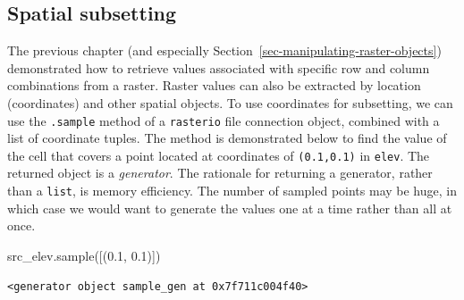 \documentclass[
  letterpaper,
]{krantz}
\newenvironment{Shaded}{\begin{snugshade}}{\end{snugshade}}
\newcommand{\FloatTok}[1]{\textcolor[rgb]{0.68,0.00,0.00}{#1}}
\newcommand{\NormalTok}[1]{\textcolor[rgb]{0.00,0.23,0.31}{#1}}
\begin{document}
\subsection{Spatial subsetting}\label{sec-spatial-subsetting-raster}

The previous chapter (and especially
Section~\ref{sec-manipulating-raster-objects}) demonstrated how to
retrieve values associated with specific row and column combinations
from a raster. Raster values can also be extracted by location
(coordinates) and other spatial objects. To use coordinates for
subsetting, we can use the \texttt{.sample} method of a
\texttt{rasterio} file connection object, combined with a list of
coordinate tuples. The method is demonstrated below to find the value of
the cell that covers a point located at coordinates of
\texttt{(0.1,0.1)} in \texttt{elev}. The returned object is a
\emph{generator}. The rationale for returning a generator, rather than a
\texttt{list}, is memory efficiency. The number of sampled points may be
huge, in which case we would want to generate the values one at a time
rather than all at once.

\begin{Shaded}
\begin{Highlighting}[]
\NormalTok{src\_elev.sample([(}\FloatTok{0.1}\NormalTok{, }\FloatTok{0.1}\NormalTok{)])}
\end{Highlighting}
\end{Shaded}

\begin{verbatim}
<generator object sample_gen at 0x7f711c004f40>
\end{verbatim}
\end{document}
